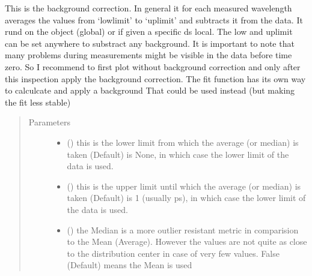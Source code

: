 \documentclass[letterpaper,10pt,english]{sphinxmanual}
\begin{document}
\begin{fulllineitems}
\begin{fulllineitems}
\label{\detokenize{plot_func:plot_func.TA.Background}}
This is the background correction. In general it for each measured
wavelength averages the values from ‘lowlimit’ to ‘uplimit’ and
subtracts it from the data. It rund on the object (global) or if
given a specific ds local.
The low and uplimit can be set anywhere to substract any background.
It is important to note that many problems during measurements might
be visible in the data before time zero. So I recommend to first
plot without background correction and only after this inspection
apply the background correction.
The fit function has its own way to calculcate and apply a background
That could be used instead (but making the fit less stable)
\begin{quote}\begin{description}
\item[{Parameters}] \leavevmode\begin{itemize}
\item {} 
 (\sphinxstyleliteralemphasis{\sphinxupquote{, }}) \textendash{} this is the lower limit from which the average (or median) is taken
(Default) is None, in which case the lower limit of the data is used.

\item {} 
 (\sphinxstyleliteralemphasis{\sphinxupquote{, }}) \textendash{} this is the upper limit until which the average (or median) is taken
(Default) is \sphinxhyphen{}1 (usually ps), in which case the lower limit of the data is used.

\item {} 
 (\sphinxstyleliteralemphasis{\sphinxupquote{, }}) \textendash{} the Median is a more outlier resistant metric in comparision to
the Mean (Average). However the values are not quite as close
to the distribution center in case of very few values. False
(Default) means the Mean is used


\end{itemize}
\end{description}
\end{quote}
\end{fulllineitems}
\end{fulllineitems}
\end{document}
